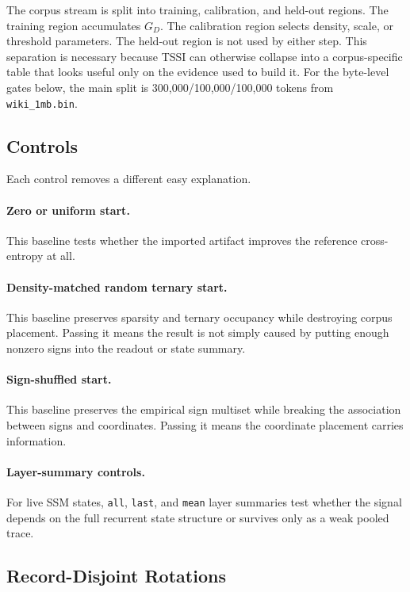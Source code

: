 \documentclass{article}
\begin{document}
The corpus stream is split into training, calibration, and held-out regions.
The training region accumulates $G_D$. The calibration region selects density,
scale, or threshold parameters. The held-out region is not used by either step.
This separation is necessary because TSSI can otherwise collapse into a
corpus-specific table that looks useful only on the evidence used to build it.
For the byte-level gates below, the main split is
300,000/100,000/100,000 tokens from \texttt{wiki\_1mb.bin}.

\subsection{Controls}

Each control removes a different easy explanation.

\paragraph{Zero or uniform start.}
This baseline tests whether the imported artifact improves the reference
cross-entropy at all.

\paragraph{Density-matched random ternary start.}
This baseline preserves sparsity and ternary occupancy while destroying corpus
placement. Passing it means the result is not simply caused by putting enough
nonzero signs into the readout or state summary.

\paragraph{Sign-shuffled start.}
This baseline preserves the empirical sign multiset while breaking the
association between signs and coordinates. Passing it means the coordinate
placement carries information.

\paragraph{Layer-summary controls.}
For live SSM states, \texttt{all}, \texttt{last}, and \texttt{mean} layer
summaries test whether the signal depends on the full recurrent state structure
or survives only as a weak pooled trace.

\subsection{Record-Disjoint Rotations}
\end{document}
